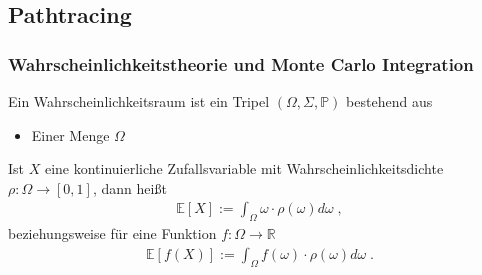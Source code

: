 \subsection{Pathtracing}
\subsubsection{Wahrscheinlichkeitstheorie und Monte Carlo Integration}  
Ein Wahrscheinlichkeitsraum ist ein Tripel $(\Omega, \Sigma, \mathbb{P})$ bestehend aus
\begin{itemize}
\item Einer Menge $\Omega$
\end{itemize}


\begin{Definition}
Ist $X$ eine kontinuierliche Zufallsvariable mit Wahrscheinlichkeitsdichte $\rho: \Omega \to [0,1]$, dann heißt
\begin{align}
\mathbb{E}[X] := \int_{\Omega} \omega \cdot \rho(\omega) d\omega \; ,
\end{align}
beziehungsweise für eine Funktion $f: \Omega \to \mathbb{R}$
\begin{align}
\mathbb{E}[f(X)] := \int_{\Omega} f(\omega) \cdot \rho(\omega) d\omega \; .
\end{align}
\end{Definition}


